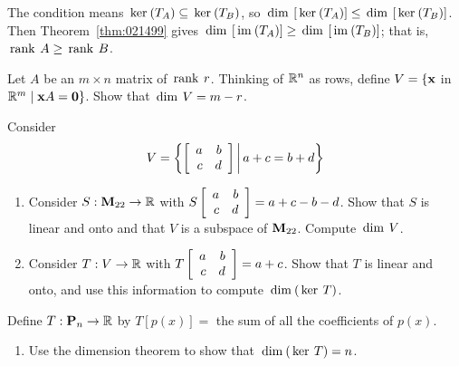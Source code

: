 \begin{multicols}{2}
\begin{ex}
\begin{sol}
The condition means $\thinspace\operatorname{ker \medspace}(T_{A}) \subseteq \thinspace\operatorname{ker\medspace}(T_{B})$, so $\thinspace\operatorname{dim\medspace}\left[\thinspace\operatorname{ker\medspace}(T_{A})\right] \leq \thinspace\operatorname{dim\medspace}\left[\thinspace\operatorname{ker\medspace}(T_{B})\right]$. Then Theorem~\ref{thm:021499} gives $\thinspace\operatorname{dim\medspace}\left[\thinspace\operatorname{im\medspace}(T_{A})\right] \geq \thinspace\operatorname{dim\medspace}\left[\thinspace\operatorname{im\medspace}(T_{B})\right]$; that is, $\thinspace\operatorname{rank \medspace}A \geq \thinspace\operatorname{rank \medspace}B$.
\end{sol}
\end{ex}

\begin{ex}
Let $A$ be an $m \times n$ matrix of $\thinspace\operatorname{rank \medspace}r$. Thinking of $\mathbb{R}^n$ as rows, define $V = \{\textbf{x}$ in $\mathbb{R}^m \mid \textbf{x}A = \textbf{0}\}$. Show that $\thinspace\operatorname{dim \medspace}V = m - r$.
\end{ex}

\begin{ex}
Consider \begin{equation*}
V = \left\lbrace \left[ \begin{array}{rr}
a & b \\
c & d
\end{array} \right] \, \middle| \, a + c = b + d \right\rbrace
\end{equation*}

\begin{enumerate}[label={\alph*.}]
\item Consider $S : \textbf{M}_{22} \to \mathbb{R}$
 with $S\left[ \begin{array}{rr}
 a & b \\
 c & d
 \end{array} \right] = a + c - b - d$. Show that $S$ is linear and onto and that $V$ is a subspace of $\textbf{M}_{22}$. Compute $\thinspace\operatorname{dim \medspace}V$.

\item Consider $T : V \to \mathbb{R}$
 with $T\left[ \begin{array}{rr}
 a & b \\
 c & d
 \end{array} \right] = a + c$. Show that $T$ is linear and onto, and use this information to compute $\thinspace\operatorname{dim\medspace}(\thinspace\operatorname{ker \medspace}T)$.

\end{enumerate}
\end{ex}

\begin{ex}
Define $T : \textbf{P}_{n} \to \mathbb{R}$ by $T\left[p(x)\right] =$ the sum of all the coefficients of $p(x)$.


\begin{enumerate}[label={\alph*.}]
\item Use the dimension theorem to show that $\thinspace\operatorname{dim\medspace}(\thinspace\operatorname{ker \medspace}T) = n$.


\end{enumerate}
\end{ex}
\end{multicols}
